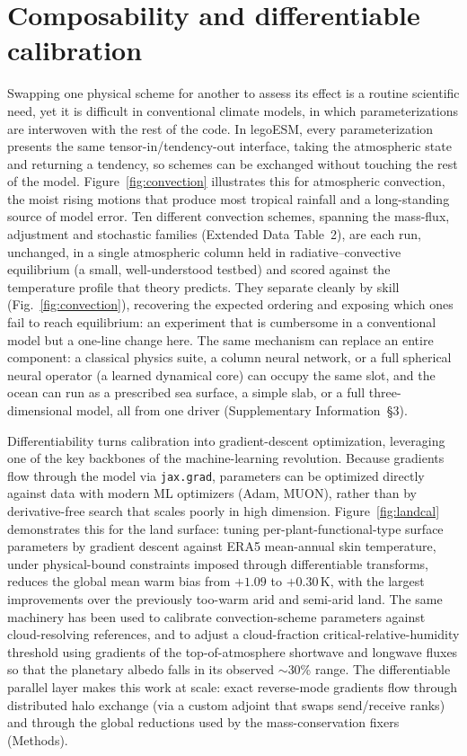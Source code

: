 \documentclass[11pt]{article}
\newcommand{\jaxgrad}{\texttt{jax.grad}}
\begin{document}
\section*{Composability and differentiable calibration}
Swapping one physical scheme for another to assess its effect is a routine scientific need,
yet it is difficult in conventional climate models, in which parameterizations are interwoven
with the rest of the code. In legoESM, every parameterization presents the same
tensor-in/tendency-out interface, taking the atmospheric state and returning a tendency, so
schemes can be exchanged without touching the rest of the model. Figure~\ref{fig:convection} illustrates this for atmospheric
convection, the moist rising motions that produce most tropical rainfall and a long-standing
source of model error. Ten different convection schemes, spanning the mass-flux, adjustment
and stochastic families (Extended Data Table~2), are each run, unchanged, in a single atmospheric
column held in radiative--convective equilibrium (a small, well-understood testbed) and scored
against the temperature profile that theory predicts. They separate cleanly by skill
(Fig.~\ref{fig:convection}), recovering the expected ordering and exposing which ones fail to
reach equilibrium: an experiment that is cumbersome in a conventional model but a one-line
change here. The same mechanism can replace an entire component: a classical physics suite, a
column neural network, or a full spherical neural operator\cite{Bonev2023} (a learned
dynamical core) can occupy the same slot, and the ocean can run as a prescribed sea surface,
a simple slab, or a full three-dimensional model, all from one driver (Supplementary
Information~\S3).

Differentiability turns calibration into gradient-descent optimization, leveraging one of the key
backbones of the machine-learning revolution. Because gradients flow through the model via
\jaxgrad{}, parameters can be optimized directly against data with modern ML optimizers (Adam,
MUON), rather than by derivative-free search\cite{Hourdin2017,Cleary2021} that scales poorly in
high dimension.
Figure~\ref{fig:landcal} demonstrates this for the land surface: tuning per-plant-functional-type
surface parameters by gradient descent against ERA5\cite{Hersbach2020} mean-annual
skin temperature, under physical-bound constraints imposed through differentiable
transforms, reduces the global mean warm bias from $+1.09$ to $+0.30$\,K, with the largest
improvements over the previously too-warm arid and semi-arid land. The same machinery has been used to calibrate convection-scheme parameters against
cloud-resolving references, and to adjust a cloud-fraction critical-relative-humidity threshold
using gradients of the top-of-atmosphere shortwave and longwave fluxes so that the planetary
albedo falls in its observed $\sim$30\% range. The differentiable parallel layer makes this
work at scale: exact reverse-mode gradients flow through distributed halo exchange (via a custom
adjoint that swaps send/receive ranks) and through the global reductions used by the
mass-conservation fixers (Methods).
\end{document}
